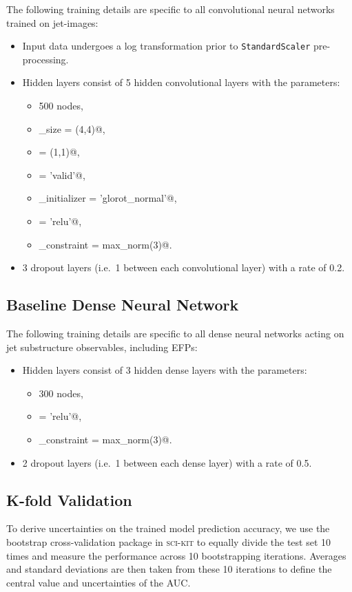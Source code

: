 \documentclass[aps,prd,twocolumn,superscriptaddress,preprintnumbers,nofootinbib,longbibliography,floatfix]{revtex4-1}
\begin{document}
 The following training details are specific to all convolutional neural networks trained on jet-images:
 \begin{itemize}
 	\item Input data undergoes a log transformation prior to \texttt{StandardScaler} pre-processing.
 	\item Hidden layers consist of 5 hidden convolutional layers with the parameters:
 	\begin{itemize}
 		\item 500 nodes,
 		\item \verb@kernel_size = (4,4)@,
 		\item \verb@strides = (1,1)@,
 		\item \verb@padding = 'valid'@,
 		\item \verb@kernel_initializer = 'glorot_normal'@,
 		\item \verb@activation = 'relu'@,
 		\item \verb@kernel_constraint = max_norm(3)@.
 	\end{itemize}
 	\item 3 dropout layers (i.e.\ 1 between each convolutional layer) with a rate of 0.2.
 \end{itemize}

\subsection{Baseline Dense Neural Network}
 \label{app:dnn_hl}
  
The following training details are specific to all dense neural networks acting on jet substructure observables, including EFPs:
\begin{itemize}
	\item Hidden layers consist of 3 hidden dense layers with the parameters:	
	\begin{itemize}
		\item 300 nodes,
		\item \verb@activation = 'relu'@,
		\item \verb@kernel_constraint = max_norm(3)@.
	\end{itemize}
	\item 2 dropout layers (i.e.\ 1 between each dense layer) with a rate of 0.5.
\end{itemize}

\subsection{K-fold Validation}
\label{app:10-fold}

To derive uncertainties on the trained model prediction accuracy, we use the bootstrap cross-validation package in \textsc{sci-kit} to equally divide the test set 10 times and measure the performance across 10 bootstrapping iterations.
Averages and standard deviations are then taken from these 10 iterations to define the central value and uncertainties of the AUC.



\end{document}
